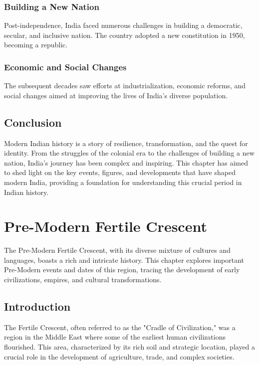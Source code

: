 \documentclass[a4paper,12pt]{book}
\begin{document}
\subsection{Building a New Nation}
Post-independence, India faced numerous challenges in building a democratic, secular, and inclusive nation. The country adopted a new constitution in 1950, becoming a republic.

\subsection{Economic and Social Changes}
The subsequent decades saw efforts at industrialization, economic reforms, and social changes aimed at improving the lives of India’s diverse population.

\section{Conclusion}
\label{sec:conclusion-modern-india}
Modern Indian history is a story of resilience, transformation, and the quest for identity. From the struggles of the colonial era to the challenges of building a new nation, India’s journey has been complex and inspiring. This chapter has aimed to shed light on the key events, figures, and developments that have shaped modern India, providing a foundation for understanding this crucial period in Indian history.

\chapter{Pre-Modern Fertile Crescent}
\label{ch:pre-modern-fertile-crescent}

The Pre-Modern Fertile Crescent, with its diverse mixture of cultures and languages, boasts a rich and intricate history. This chapter explores important Pre-Modern events and dates of this region, tracing the development of early civilizations, empires, and cultural transformations.

\section{Introduction}
\label{sec:introduction-fertile-crescent}

The Fertile Crescent, often referred to as the "Cradle of Civilization," was a region in the Middle East where some of the earliest human civilizations flourished. This area, characterized by its rich soil and strategic location, played a crucial role in the development of agriculture, trade, and complex societies.
\end{document}
